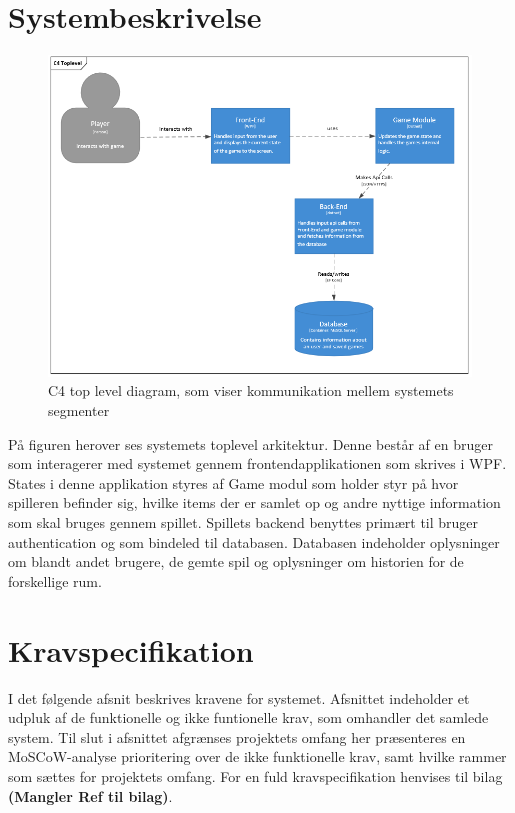 \section{Systembeskrivelse}

\begin{figure}[H]
\centering
\includegraphics[width = \textwidth]{02-Body/Images/C4TopLvlDB}
\caption{C4 top level diagram, som viser kommunikation mellem systemets segmenter}
\label{fig:C4TopLvlDB}
\end{figure}

På figuren herover ses systemets toplevel arkitektur.
Denne består af en bruger som interagerer med systemet gennem frontendapplikationen som skrives i WPF. States i denne applikation styres af Game modul som holder styr på hvor spilleren befinder sig, hvilke items der er samlet op og andre nyttige information som skal bruges gennem spillet.
Spillets backend benyttes primært til bruger authentication og som bindeled til databasen.
Databasen indeholder oplysninger om blandt andet brugere, de gemte spil og oplysninger om historien for de forskellige rum.

\newpage


\section{Kravspecifikation}
\label{sec:kravspec}

I det følgende afsnit beskrives kravene for systemet. Afsnittet indeholder et udpluk af de funktionelle og ikke funtionelle krav, som omhandler det samlede system. Til slut i afsnittet afgrænses projektets omfang her præsenteres en MoSCoW-analyse prioritering over de ikke funktionelle krav, samt hvilke rammer som sættes for projektets omfang. For en fuld kravspecifikation henvises til bilag \textbf{(Mangler Ref til bilag)}.\\  


